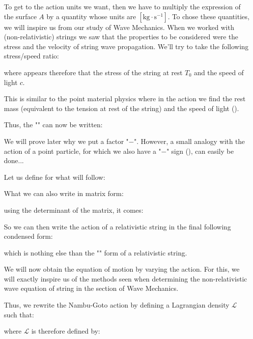 		To get to the action units we want, then we have to multiply the expression of the surface $A$ by a quantity whose units are $[\text{kg}\cdot\text{s}^{-1}]$. To chose these quantities, we will inspire us from our study of Wave Mechanics. When we worked with (non-relativistic) strings we saw that the properties to be considered were the stress and the velocity of string wave propagation. We'll try to take the following stress/speed ratio:
	
	where appears therefore that the stress of the string at rest $T_0$ and the speed of light $c$. 
	
	\begin{tcolorbox}[title=Remark,colframe=black,arc=10pt]
	This is similar to the point material physics where in the action we find the rest mass (equivalent to the tension at rest of the string) and the speed of light ().
	\end{tcolorbox}
	Thus, the "" can now be written:
	
	\begin{tcolorbox}[title=Remark,colframe=black,arc=10pt]
	We will prove later why we put a factor "$-$". However, a small analogy with the action of a point particle, for which we also have a "$-$" sign (), can easily be done...
	\end{tcolorbox}
	Let us define for what will follow:
	
	What we can also write in matrix form:
	
	using the determinant of the matrix, it comes:
	
	So we can then write the action of a relativistic string in the final following condensed form:
	
	which is nothing else than the "" form of a relativistic string.
	
	We will now obtain the equation of motion by varying the action. For this, we will exactly inspire us of the methods seen when determining the non-relativistic wave equation of string in the section of Wave Mechanics.

	Thus, we rewrite the Nambu-Goto action by defining a Lagrangian density $\mathcal{L}$ such that:
	
	where $\mathcal{L}$ is therefore defined by:
	
